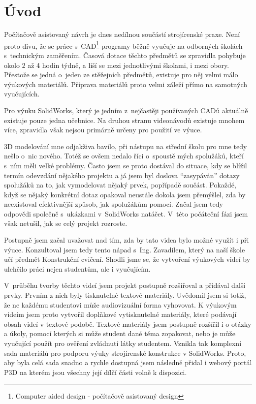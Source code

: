 \chapter*{Úvod}
Počítačově asistovaný návrh je dnes nedílnou součástí strojírenské praxe.
Není proto divu, že se práce s~CAD\footnote{Computer aided design - počítačově asistovaný design} programy běžně vyučuje na odborných školách s~technickým zaměřením.
Časová dotace těchto předmětů se zpravidla pohybuje okolo 2 až 4 hodin týdně, a liší se mezi jednotlivými školami, i mezi obory.
Přestože se jedná o~jeden ze stěžejních předmětů, existuje pro něj velmi málo výukových materiálů.
Příprava materiálů proto velmi záleží přímo na samotných vyučujících.

Pro výuku SolidWorks, který je jedním z~nejčastěji používaných CADů aktuálně existuje pouze jedna učebnice.
Na druhou stranu videonávodů existuje mnohem více, zpravidla však nejsou primárně určeny pro použití ve výuce.

3D modelování mne odjakživa bavilo, při nástupu na střední školu pro mne tedy nešlo o~nic nového.
Totéž se ovšem nedalo říci o~spoustě mých spolužáků, kteří s~ním měli velké problémy.
Často jsem se proto dostával do situace, kdy se blížil termín odevzdání nějakého projektu a já jsem byl doslova \enquote{zasypáván} dotazy spolužáků na to, jak vymodelovat nějaký prvek, popřípadě součást.
Pokaždé, když se nějaký konkrétní dotaz opakoval neustále dokola jsem přemýšlel, zda by neexistoval efektivnější způsob, jak spolužákům pomoci.
Začal jsem tedy odpovědi společně s~ukázkami v~SolidWorks natáčet.
V~této počáteční fázi jsem však netušil, jak se celý projekt rozroste.

Postupně jsem začal uvažovat nad tím, zda by tato videa bylo možné využít i při výuce.
Konzultoval jsem tedy tento nápad s~Ing. Zavadilem, který na naší škole učí předmět Konstrukční cvičení.
Shodli jsme se, že vytvoření výukových videí by ulehčilo práci nejen studentům, ale i vyučujícím.

V~průběhu tvorby těchto videí jsem projekt postupně rozšiřoval a přidával další prvky.
Prvním z nich byly tisknutelné textové materiály.
Uvědomil jsem si totiž, že ne každému studentovi může audiovizuální forma vyhovovat.
K výukovým videím jsem proto vytvořil doplňkové vytisknutelné materiály, které podávají obsah videí v textové podobě.
Textové materiály jsem postupně rozšířil i o otázky a úkoly, pomocí kterých si může student dané téma zopakovat, nebo je může vyučující použít pro ověření zvládnutí látky studentem.
Vznikla tak komplexní sada materiálů pro podporu výuky strojírenské konstrukce v SolidWorks.
Proto, aby byla celá sada snadno a rychle dostupná jsem následně přidal i webový portál P3D na kterém jsou všechny její dílčí části volně k dispozici.

